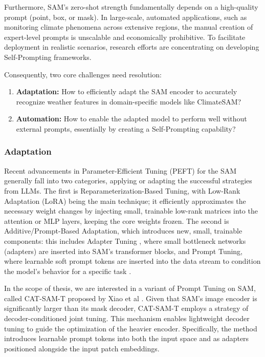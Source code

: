 Furthermore, SAM's zero-shot strength fundamentally depends on a high-quality prompt (point, box, or mask). In large-scale, automated applications, such as monitoring climate phenomena across extensive regions, the manual creation of expert-level prompts is unscalable and economically prohibitive. To facilitate deployment in realistic scenarios, research efforts are concentrating on developing Self-Prompting frameworks.

Consequently, two core challenges need resolution:
\begin{enumerate}
    \item \textbf{Adaptation:} How to efficiently adapt the SAM encoder to accurately recognize weather features in domain-specific models like ClimateSAM?
    \item \textbf{Automation:} How to enable the adapted model to perform well without external prompts, essentially by creating a Self-Prompting capability?
\end{enumerate}

\subsubsection{Adaptation}
Recent advancements in Parameter-Efficient Tuning (PEFT) \cite{bommasani2021opportunities, gu2023systematic} for the SAM generally fall into two categories, applying or adapting the successful strategies from LLMs. The first is Reparameterization-Based Tuning, with Low-Rank Adaptation (LoRA) \cite{zhang2023customized, zhong2024convolution} being the main technique; it efficiently approximates the necessary weight changes by injecting small, trainable low-rank matrices into the attention or MLP layers, keeping the core weights frozen. The second is Additive/Prompt-Based Adaptation, which introduces new, small, trainable components: this includes Adapter Tuning \cite{pu2025classwise}, where small bottleneck networks (adapters) are inserted into SAM's transformer blocks, and Prompt Tuning, where learnable soft prompt tokens are inserted into the data stream to condition the model's behavior for a specific task \cite{xiao2024cat, teuber2025parameterefficientfinetuningsegment, han2024parameterefficientfinetuninglargemodels}.  

In the scope of thesis, we are interested in a variant of  Prompt Tuning on SAM, called CAT-SAM-T proposed by Xiao et al \cite{xiao2024cat}. Given that SAM's image encoder is significantly larger than its mask decoder, CAT-SAM-T employs a strategy of decoder-conditioned joint tuning. This mechanism enables lightweight decoder tuning to guide the optimization of the heavier encoder. Specifically, the method introduces learnable prompt tokens into both the input space and as adapters positioned alongside the input patch embeddings.

